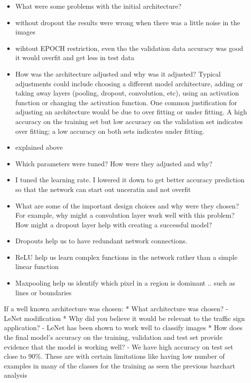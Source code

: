 \documentclass[11pt]{article}
\providecommand{\tightlist}{%
      \setlength{\itemsep}{0pt}\setlength{\parskip}{0pt}}
\begin{document}
\begin{itemize}
\tightlist
\item
  What were some problems with the initial architecture?
\item
  without dropout the results were wrong when there was a little noise
  in the images
\item
  wihtout EPOCH restriction, even tho the validation data accuracy was
  good it would overfit and get less in test data
\item
  How was the architecture adjusted and why was it adjusted? Typical
  adjustments could include choosing a different model architecture,
  adding or taking away layers (pooling, dropout, convolution, etc),
  using an activation function or changing the activation function. One
  common justification for adjusting an architecture would be due to
  over fitting or under fitting. A high accuracy on the training set but
  low accuracy on the validation set indicates over fitting; a low
  accuracy on both sets indicates under fitting.
\item
  explained above
\item
  Which parameters were tuned? How were they adjusted and why?
\item
  I tuned the learning rate. I lowered it down to get better accuracy
  prediction so that the network can start out unceratin and not overfit
\item
  What are some of the important design choices and why were they
  chosen? For example, why might a convolution layer work well with this
  problem? How might a dropout layer help with creating a successful
  model?
\item
  Dropouts help us to have redundant network connections.
\item
  ReLU help us learn complex functions in the network rather than a
  simple linear function
\item
  Maxpooling help us identify which pixel in a region is dominant ..
  such as lines or boundaries
\end{itemize}

If a well known architecture was chosen: * What architecture was chosen?
- LeNet modification * Why did you believe it would be relevant to the
traffic sign application? - LeNet has been shown to work well to
classify images * How does the final model's accuracy on the training,
validation and test set provide evidence that the model is working well?
- We have high accuracy on test set close to 90\%. These are with
certain limitations like having low number of examples in many of the
classes for the training as seen the previous barchart analysis
\end{document}
